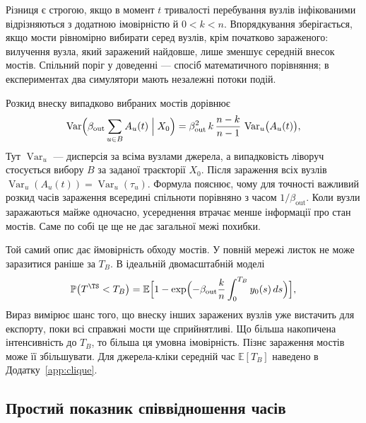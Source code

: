 Різниця є строгою, якщо в момент $t$ тривалості перебування вузлів інфікованими відрізняються з додатною імовірністю й $0<k<n$. Впорядкування зберігається, якщо мости рівномірно вибирати серед вузлів, крім початково зараженого: вилучення вузла, який заражений найдовше, лише зменшує середній внесок мостів. Спільний поріг у доведенні --- спосіб математичного порівняння; в експериментах два симулятори мають незалежні потоки подій.
\par Розкид внеску випадково вибраних мостів дорівнює
\begin{equation}
\label{eq:hazard_variance}
\operatorname{Var}\Bigl(\beta_{\mathrm{out}}\sum_{u\in B}A_u(t)\Bigm| X_0\Bigr)=\beta_{\mathrm{out}}^2\,k\,\frac{n-k}{n-1}\,\operatorname{Var}_u\bigl(A_u(t)\bigr),
\end{equation}
Тут $\operatorname{Var}_u$ --- дисперсія за всіма вузлами джерела, а випадковість ліворуч стосується вибору $B$ за заданої траєкторії $X_0$. Після зараження всіх вузлів $\operatorname{Var}_u(A_u(t))=\operatorname{Var}_u(\tau_u)$. Формула пояснює, чому для точності важливий розкид часів зараження всередині спільноти порівняно з часом $1/\beta_{\mathrm{out}}$. Коли вузли заражаються майже одночасно, усереднення втрачає менше інформації про стан мостів. Саме по собі це ще не дає загальної межі похибки.

Той самий опис дає ймовірність обходу мостів. У повній мережі листок не може заразитися раніше за $T_B$. В ідеальній двомасштабній моделі
\begin{equation}
\label{eq:bypass}
\mathbb{P}\bigl(T^{\TS}<T_B\bigr)=\mathbb{E}\Bigl[1-\exp\Bigl(-\beta_{\mathrm{out}}\frac{k}{n}\int_0^{T_B}y_0(s)\,ds\Bigr)\Bigr],
\end{equation}
Вираз вимірює шанс того, що внеску інших заражених вузлів уже вистачить для експорту, поки всі справжні мости ще сприйнятливі. Що більша накопичена інтенсивність до $T_B$, то більша ця умовна імовірність. Пізнє зараження мостів може її збільшувати. Для джерела-кліки середній час $\mathbb{E}[T_B]$ наведено в Додатку~\ref{app:clique}.

\subsection{Простий показник співвідношення часів}
\label{sec:descriptor}

